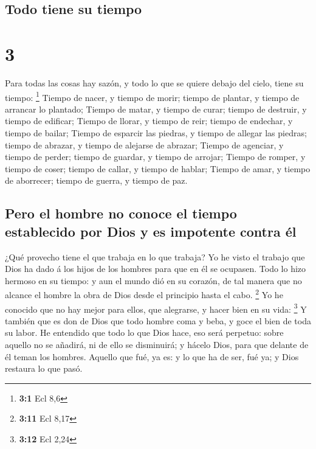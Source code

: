 \hypertarget{todo-tiene-su-tiempo}{%
\subsection{Todo tiene su tiempo}\label{todo-tiene-su-tiempo}}

\hypertarget{section-2}{%
\section{3}\label{section-2}}

 Para todas las cosas hay sazón, y todo lo que se quiere
debajo del cielo, tiene su tiempo: \footnote{\textbf{3:1} Ecl 8,6}
 Tiempo de nacer, y tiempo de morir; tiempo de plantar, y
tiempo de arrancar lo plantado;  Tiempo de matar, y tiempo
de curar; tiempo de destruir, y tiempo de edificar; 
Tiempo de llorar, y tiempo de reir; tiempo de endechar, y tiempo de
bailar;  Tiempo de esparcir las piedras, y tiempo de
allegar las piedras; tiempo de abrazar, y tiempo de alejarse de abrazar;
 Tiempo de agenciar, y tiempo de perder; tiempo de
guardar, y tiempo de arrojar;  Tiempo de romper, y tiempo
de coser; tiempo de callar, y tiempo de hablar;  Tiempo de
amar, y tiempo de aborrecer; tiempo de guerra, y tiempo de paz.

\hypertarget{pero-el-hombre-no-conoce-el-tiempo-establecido-por-dios-y-es-impotente-contra-uxe9l}{%
\subsection{Pero el hombre no conoce el tiempo establecido por Dios y es
impotente contra
él}\label{pero-el-hombre-no-conoce-el-tiempo-establecido-por-dios-y-es-impotente-contra-uxe9l}}

 ¿Qué provecho tiene el que trabaja en lo que trabaja?
 Yo he visto el trabajo que Dios ha dado á los hijos de
los hombres para que en él se ocupasen.  Todo lo hizo
hermoso en su tiempo: y aun el mundo dió en su corazón, de tal manera
que no alcance el hombre la obra de Dios desde el principio hasta el
cabo. \footnote{\textbf{3:11} Ecl 8,17}  Yo he conocido
que no hay mejor para ellos, que alegrarse, y hacer bien en su vida:
\footnote{\textbf{3:12} Ecl 2,24}  Y también que es don
de Dios que todo hombre coma y beba, y goce el bien de toda su labor.
 He entendido que todo lo que Dios hace, eso será
perpetuo: sobre aquello no se añadirá, ni de ello se disminuirá; y
hácelo Dios, para que delante de él teman los hombres. 
Aquello que fué, ya es: y lo que ha de ser, fué ya; y Dios restaura lo
que pasó.

